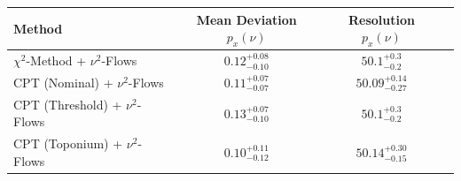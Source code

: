     \begin{tabular}{lccc}
        \toprule
        Method & Mean Deviation $p_{x}(\nu)$ & Resolution $p_{x}(\nu)$ \\
        \midrule
        $\chi^2$-Method + $\nu^2$-Flows & $0.12^{+0.08}_{-0.10}$ & $50.1^{+0.3}_{-0.2}$ \\
        CPT (Nominal) + $\nu^2$-Flows & $0.11^{+0.07}_{-0.07}$ & $50.09^{+0.14}_{-0.27}$ \\
        CPT (Threshold) + $\nu^2$-Flows & $0.13^{+0.07}_{-0.10}$ & $50.1^{+0.3}_{-0.2}$ \\
        CPT (Toponium) + $\nu^2$-Flows & $0.10^{+0.11}_{-0.12}$ & $50.14^{+0.30}_{-0.15}$ \\
        \bottomrule
    \end{tabular}